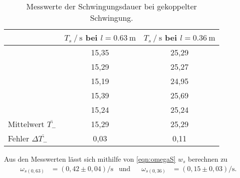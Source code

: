 \begin{table}[H]
  \centering
  \caption{Messwerte der Schwingungsdauer bei gekoppelter Schwingung.}
  \label{tab:Ts}
  \begin{tabular}{l S S}
    \toprule
     & {$T_s \mathbin{/} \si{\second}$ bei $l=\qty{0.63}{\meter}$} & {$T_s \mathbin{/} \si{\second}$ bei $l=\qty{0.36}{\meter}$}\\
    \midrule
      &15,35& 25,29\\
      &15,29& 25,27\\
      &15,19& 24,95\\
      &15,39& 25,69\\
      &15,24& 25,24\\
    \midrule
      Mittelwert $\overline{T_-}$& 15,29 & 25,29\\
      Fehler $\Delta \overline{T_-}$& 0,03 & 0,11\\
    \bottomrule
  \end{tabular}
\end{table}

Aus den Messwerten lässt sich mithilfe von \autoref{eqn:omegaS} $w_s$ berechnen zu 
\begin{align*}
  \omega_{s(0,63)}&=(0,42 \pm 0,04) \si{\per\second} & \text{und} && \omega_{s(0,36)}&=(0,15 \pm 0,03) \si{\per\second}.
\end{align*}






